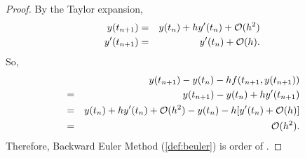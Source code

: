 \documentclass[12pt]  {article}%
\begin{document}
\begin{proof}
By the Taylor expansion,
 \begin{eqnarray}\label{eqn:beulertay}
 y(t_{n+1})&=&y(t_n)+hy'(t_n)+\mathcal{O}{(h^2)}\\
 y'(t_{n+1})&=&y'(t_n)+\mathcal{O}(h).
\end{eqnarray}
So,
 \begin{eqnarray}\label{eqn:beulerdiff1}
&&y(t_{n+1})-y(t_n)-h f(t_{n+1},y(t_{n+1}))\nonumber\\&=&y(t_{n+1})-y(t_n)+h y'(t_{n+1})\nonumber\\
 &=&y(t_n)+hy'(t_n)+\mathcal{O}{(h^2)}-y(t_n)-h[y'(t_n)+\mathcal{O}(h)]\\
 &=&\mathcal{O}{(h^2)}\nonumber.
\end{eqnarray}
Therefore, Backward Euler Method (\ref{def:beuler}) is order of .
\end{proof}
\end{document}

